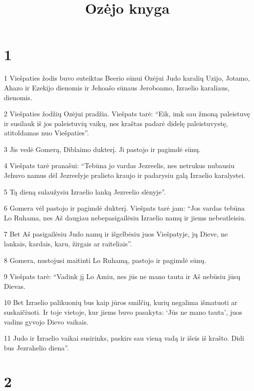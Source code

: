 

\title{Ozėjo knyga}

\chapter{1}


\par 1 Viešpaties žodis buvo suteiktas Beerio sūnui Ozėjui Judo karalių Uzijo, Jotamo, Ahazo ir Ezekijo dienomis ir Jehoašo sūnaus Jeroboamo, Izraelio karaliaus, dienomis. 
\par 2 Viešpaties žodžių Ozėjui pradžia. Viešpats tarė: “Eik, imk sau žmoną paleistuvę ir susilauk iš jos paleistuvių vaikų, nes kraštas padarė didelę paleistuvystę, atitoldamas nuo Viešpaties”. 
\par 3 Jis vedė Gomerą, Diblaimo dukterį. Ji pastojo ir pagimdė sūnų. 
\par 4 Viešpats tarė pranašui: “Tebūna jo vardas Jezreelis, nes netrukus nubausiu Jehuvo namus dėl Jezreelyje pralieto kraujo ir padarysiu galą Izraelio karalystei. 
\par 5 Tą dieną sulaužysiu Izraelio lanką Jezreelio slėnyje”. 
\par 6 Gomera vėl pastojo ir pagimdė dukterį. Viešpats tarė jam: “Jos vardas tebūna Lo Ruhama, nes Aš daugiau nebepasigailėsiu Izraelio namų ir jiems nebeatleisiu. 
\par 7 Bet Aš pasigailėsiu Judo namų ir išgelbėsiu juos Viešpatyje, jų Dieve, ne lankais, kardais, karu, žirgais ar raiteliais”. 
\par 8 Gomera, nustojusi maitinti Lo Ruhamą, pastojo ir pagimdė sūnų. 
\par 9 Viešpats tarė: “Vadink jį Lo Amiu, nes jūs ne mano tauta ir Aš nebūsiu jūsų Dievas. 
\par 10 Bet Izraelio palikuonių bus kaip jūros smilčių, kurių negalima išmatuoti ar suskaičiuoti. Ir toje vietoje, kur jiems buvo pasakyta: ‘Jūs ne mano tauta’, juos vadins gyvojo Dievo vaikais. 
\par 11 Judo ir Izraelio vaikai susirinks, paskirs sau vieną vadą ir išeis iš krašto. Didi bus Jezrahelio diena”.


\chapter{2}


